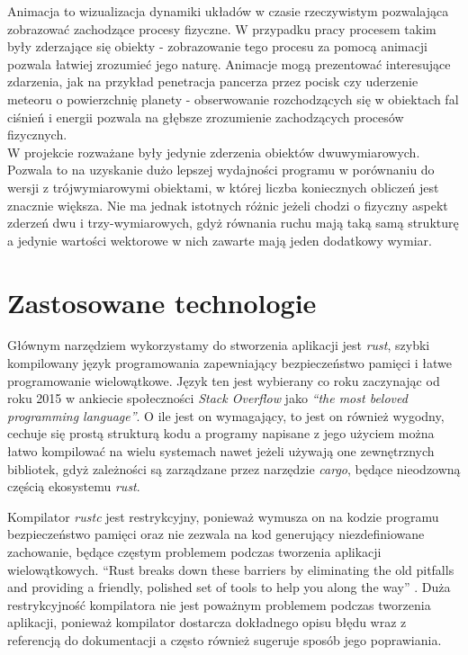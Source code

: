 \documentclass[12pt, letterpaper]{report}
\begin{document}
    Animacja to wizualizacja dynamiki układów w czasie rzeczywistym pozwalająca
    zobrazować zachodzące procesy fizyczne. W przypadku pracy procesem takim były 
    zderzające się obiekty - zobrazowanie tego procesu za pomocą animacji pozwala łatwiej zrozumieć jego naturę.
    Animacje mogą prezentować interesujące zdarzenia, jak na przykład penetracja pancerza przez 
    pocisk czy uderzenie meteoru o powierzchnię planety - obserwowanie 
    rozchodzących się w obiektach fal ciśnień i energii pozwala na głębsze zrozumienie zachodzących 
    procesów fizycznych. \\


    W projekcie rozważane były jedynie zderzenia obiektów dwuwymiarowych. Pozwala to na uzyskanie dużo lepszej
    wydajności programu w porównaniu do wersji z trójwymiarowymi obiektami, w której liczba koniecznych obliczeń jest
    znacznie większa. Nie ma jednak istotnych różnic jeżeli chodzi o fizyczny aspekt zderzeń dwu i trzy-wymiarowych, gdyż 
    równania ruchu mają taką samą strukturę a jedynie wartości wektorowe w nich zawarte mają jeden dodatkowy wymiar. \\



    \section{Zastosowane technologie}

    Głównym narzędziem wykorzystamy do stworzenia aplikacji jest \emph{rust}, szybki kompilowany 
    język programowania zapewniający bezpieczeństwo pamięci i łatwe programowanie wielowątkowe. 
    Język ten jest wybierany co roku zaczynając od roku 2015 w ankiecie społeczności \emph{Stack Overflow} jako 
    \emph{``the most beloved programming language''}. O ile jest on wymagający, to jest 
    on również wygodny, cechuje się prostą strukturą kodu a programy napisane z jego użyciem 
    można łatwo kompilować na wielu systemach nawet jeżeli używają one zewnętrznych bibliotek, gdyż 
    zależności są zarządzane przez narzędzie \emph{cargo}, będące nieodzowną częścią ekosystemu \emph{rust}.
    
    Kompilator \emph{rustc} jest restrykcyjny, ponieważ wymusza on na kodzie programu bezpieczeństwo pamięci oraz
    nie zezwala na kod generujący niezdefiniowane zachowanie, będące częstym problemem podczas tworzenia aplikacji
    wielowątkowych. ``Rust breaks down these barriers by eliminating the old pitfalls and providing a friendly, 
    polished set of tools to help you along the way'' \cite{rustbook}. Duża restrykcyjność kompilatora 
    nie jest poważnym problemem podczas tworzenia aplikacji, ponieważ kompilator dostarcza dokładnego opisu 
    błędu wraz z referencją do dokumentacji a często również sugeruje sposób jego poprawiania. \\
\end{document}
